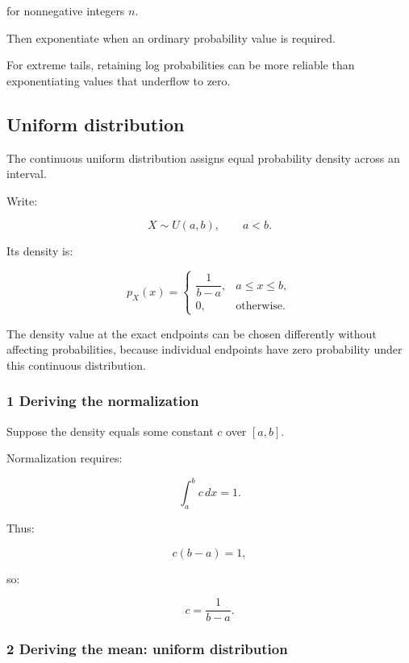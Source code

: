 for nonnegative integers \(n\).

Then exponentiate when an ordinary probability value is required.

For extreme tails, retaining log probabilities can be more reliable than exponentiating values that underflow to zero.

\subsection{Uniform distribution}\label{02-foundations-ii-ch023-uniform-distribution}

\hypertarget{02-foundations-ii-ch023-uniform-distribution}{}

The continuous uniform distribution assigns equal probability density across an interval.

Write:

\[
 X\sim U(a,b), \qquad a<b.
\]

Its density is:

\[
 \boxed{ p_X(x)= \begin{cases} \dfrac1{b-a},&a\le x\le b,\\ 0,&\text{otherwise}. \end{cases} }
\]

The density value at the exact endpoints can be chosen differently without affecting probabilities, because individual endpoints have zero probability under this continuous distribution.

\subsubsection{1 Deriving the normalization}\label{02-foundations-ii-ch023-deriving-the-normalization}

\hypertarget{02-foundations-ii-ch023-deriving-the-normalization}{}

Suppose the density equals some constant \(c\) over \([a,b]\).

Normalization requires:

\[
 \int_a^bc\,dx=1.
\]

Thus:

\[
 c(b-a)=1,
\]

so:

\[
 \boxed{c=\frac1{b-a}}.
\]

\subsubsection{2 Deriving the mean: uniform distribution}\label{02-foundations-ii-ch023-deriving-the-mean-uniform-distribution}

